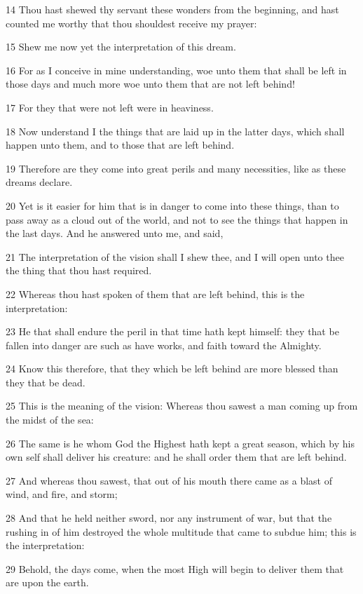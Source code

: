 \par 14 Thou hast shewed thy servant these wonders from the beginning, and hast counted me worthy that thou shouldest receive my prayer:
\par 15 Shew me now yet the interpretation of this dream.
\par 16 For as I conceive in mine understanding, woe unto them that shall be left in those days and much more woe unto them that are not left behind!
\par 17 For they that were not left were in heaviness.
\par 18 Now understand I the things that are laid up in the latter days, which shall happen unto them, and to those that are left behind.
\par 19 Therefore are they come into great perils and many necessities, like as these dreams declare.
\par 20 Yet is it easier for him that is in danger to come into these things, than to pass away as a cloud out of the world, and not to see the things that happen in the last days. And he answered unto me, and said,
\par 21 The interpretation of the vision shall I shew thee, and I will open unto thee the thing that thou hast required.
\par 22 Whereas thou hast spoken of them that are left behind, this is the interpretation:
\par 23 He that shall endure the peril in that time hath kept himself: they that be fallen into danger are such as have works, and faith toward the Almighty.
\par 24 Know this therefore, that they which be left behind are more blessed than they that be dead.
\par 25 This is the meaning of the vision: Whereas thou sawest a man coming up from the midst of the sea:
\par 26 The same is he whom God the Highest hath kept a great season, which by his own self shall deliver his creature: and he shall order them that are left behind.
\par 27 And whereas thou sawest, that out of his mouth there came as a blast of wind, and fire, and storm;
\par 28 And that he held neither sword, nor any instrument of war, but that the rushing in of him destroyed the whole multitude that came to subdue him; this is the interpretation:
\par 29 Behold, the days come, when the most High will begin to deliver them that are upon the earth.
